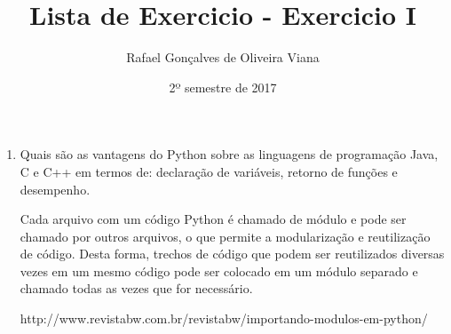 \documentclass[12pt]{article}
\title{Lista de Exercicio  - Exercicio I }
\author{Rafael Gonçalves de  Oliveira Viana}
\date{2º semestre de 2017}
\begin{document}
\maketitle

\begin{enumerate}
\item
Quais são as vantagens do Python sobre as linguagens de programação Java, C e C++
em termos de: declaração de variáveis, retorno de funções e desempenho.

Cada arquivo com um código Python é chamado de módulo e pode ser chamado por outros arquivos, o que permite a modularização e
reutilização de código. Desta forma, trechos de código que podem ser reutilizados diversas vezes em um mesmo código pode ser colocado em
um módulo separado e chamado todas as vezes que for necessário.


http://www.revistabw.com.br/revistabw/importando-modulos-em-python/
\end{enumerate}
\end{document}
